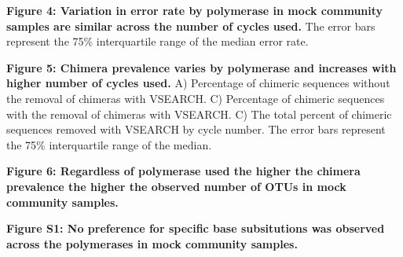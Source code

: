 \documentclass[11pt,]{article}
\begin{document}
\textbf{Figure 4: Variation in error rate by polymerase in mock
community samples are similar across the number of cycles used.} The
error bars represent the 75\% interquartile range of the median error
rate.

\textbf{Figure 5: Chimera prevalence varies by polymerase and increases
with higher number of cycles used.} A) Percentage of chimeric sequences
without the removal of chimeras with VSEARCH. C) Percentage of chimeric
sequences with the removal of chimeras with VSEARCH. C) The total
percent of chimeric sequences removed with VSEARCH by cycle number. The
error bars represent the 75\% interquartile range of the median.

\textbf{Figure 6: Regardless of polymerase used the higher the chimera
prevalence the higher the observed number of OTUs in mock community
samples.}

\newpage

\textbf{Figure S1: No preference for specific base subsitutions was
observed across the polymerases in mock community samples.}
\end{document}
